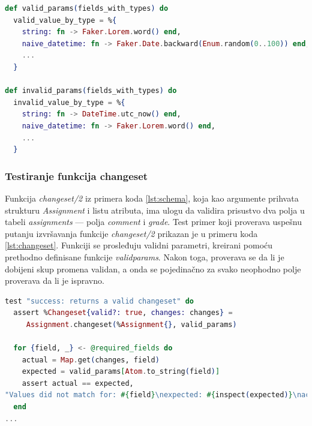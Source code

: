 \documentclass[12pt,oneside]{memoir}
\begin{document}
\begin{minipage}{\linewidth}
\begin{lstlisting}[language=elixir, basicstyle=\small, caption={Definicije pomoćnih funkcija \emph{valid{\textunderscore}params} i \emph{invalid{\textunderscore}params}},captionpos=b, label={lst:faker}]
def valid_params(fields_with_types) do
  valid_value_by_type = %{
    string: fn -> Faker.Lorem.word() end,
    naive_datetime: fn -> Faker.Date.backward(Enum.random(0..100)) end,
    ...  
  }

def invalid_params(fields_with_types) do
  invalid_value_by_type = %{
    string: fn -> DateTime.utc_now() end,
    naive_datetime: fn -> Faker.Lorem.word() end,
    ...
  }
\end{lstlisting}
\end{minipage}

\vspace*{1\baselineskip}

\subsubsection{Testiranje funkcija changeset}

\par Funkcija \emph{changeset/2} iz primera koda \ref{lst:schema}, koja kao argumente prihvata strukturu \emph{Assignment} i listu atributa, ima ulogu da validira prisustvo dva polja u tabeli \emph{assignments} --- polja \emph{comment} i \emph{grade}. Test primer koji proverava uspešnu putanju izvršavanja funkcije \emph{changeset/2} prikazan je u primeru koda \ref{lst:changeset}. Funkciji se prosleđuju validni parametri, kreirani pomoću prethodno definisane funkcije \emph{valid{\textunderscore}params}. Nakon toga, proverava se da li je dobijeni skup promena validan, a onda se pojedinačno za svako neophodno polje proverava da li je ispravno. \\


\begin{minipage}{\linewidth}
\begin{lstlisting}[language=elixir, basicstyle=\small, caption={Test primer uspešne upotrebe funkcije \emph{changeset/2}},captionpos=b, label={lst:changeset}]
test "success: returns a valid changeset" do
  assert %Changeset{valid?: true, changes: changes} = 
     Assignment.changeset(%Assignment{}, valid_params)

  for {field, _} <- @required_fields do
    actual = Map.get(changes, field)
    expected = valid_params[Atom.to_string(field)]
    assert actual == expected,
"Values did not match for: #{field}\nexpected: #{inspect(expected)}\nactual: #{inspect(actual)}"
  end 
...
\end{lstlisting}
\end{minipage}
\end{document}
